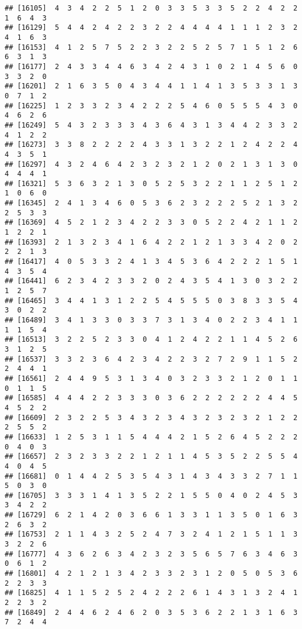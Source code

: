 \documentclass[
]{article}
\begin{document}
\begin{verbatim}
## [16105]  4  3  4  2  2  5  1  2  0  3  3  5  3  3  5  2  2  4  2  2  1  6  4  3
## [16129]  5  4  4  2  4  2  2  3  2  2  4  4  4  4  1  1  1  2  3  2  4  1  6  3
## [16153]  4  1  2  5  7  5  2  2  3  2  2  5  2  5  7  1  5  1  2  6  6  3  1  3
## [16177]  2  4  3  3  4  4  6  3  4  2  4  3  1  0  2  1  4  5  6  0  3  3  2  0
## [16201]  2  1  6  3  5  0  4  3  4  4  1  1  4  1  3  5  3  3  1  3  0  7  1  2
## [16225]  1  2  3  3  2  3  4  2  2  2  5  4  6  0  5  5  5  4  3  0  4  6  2  6
## [16249]  5  4  3  2  3  3  3  4  3  6  4  3  1  3  4  4  2  3  3  2  4  1  2  2
## [16273]  3  3  8  2  2  2  2  4  3  3  1  3  2  2  1  2  4  2  2  4  4  3  5  1
## [16297]  4  3  2  4  6  4  2  3  2  3  2  1  2  0  2  1  3  1  3  0  4  4  4  1
## [16321]  5  3  6  3  2  1  3  0  5  2  5  3  2  2  1  1  2  5  1  2  1  0  6  0
## [16345]  2  4  1  3  4  6  0  5  3  6  2  3  2  2  2  5  2  1  3  2  2  5  3  3
## [16369]  4  5  2  1  2  3  4  2  2  3  3  0  5  2  2  4  2  1  1  2  1  2  2  1
## [16393]  2  1  3  2  3  4  1  6  4  2  2  1  2  1  3  3  4  2  0  2  2  2  1  3
## [16417]  4  0  5  3  3  2  4  1  3  4  5  3  6  4  2  2  2  1  5  1  4  3  5  4
## [16441]  6  2  3  4  2  3  3  2  0  2  4  3  5  4  1  3  0  3  2  2  1  2  5  7
## [16465]  3  4  4  1  3  1  2  2  5  4  5  5  5  0  3  8  3  3  5  4  3  0  2  2
## [16489]  3  4  1  3  3  0  3  3  7  3  1  3  4  0  2  2  3  4  1  1  1  1  5  4
## [16513]  3  2  2  5  2  3  3  0  4  1  2  4  2  2  1  1  4  5  2  6  3  1  2  5
## [16537]  3  3  2  3  6  4  2  3  4  2  2  3  2  7  2  9  1  1  5  2  2  4  4  1
## [16561]  2  4  4  9  5  3  1  3  4  0  3  2  3  3  2  1  2  0  1  1  0  1  1  5
## [16585]  4  4  4  2  2  3  3  3  0  3  6  2  2  2  2  2  2  4  4  5  4  5  2  2
## [16609]  2  3  2  2  5  3  4  3  2  3  4  3  2  3  2  3  2  1  2  2  2  5  5  2
## [16633]  1  2  5  3  1  1  5  4  4  4  2  1  5  2  6  4  5  2  2  2  0  4  0  3
## [16657]  2  3  2  3  3  2  2  1  2  1  1  4  5  3  5  2  2  5  5  4  4  0  4  5
## [16681]  0  1  4  4  2  5  3  5  4  3  1  4  3  4  3  3  2  7  1  1  5  0  3  0
## [16705]  3  3  3  1  4  1  3  5  2  2  1  5  5  0  4  0  2  4  5  3  3  4  2  2
## [16729]  6  2  1  4  2  0  3  6  6  1  3  3  1  1  3  5  0  1  6  3  2  6  3  2
## [16753]  2  1  1  4  3  2  5  2  4  7  3  2  4  1  2  1  5  1  1  3  3  2  2  6
## [16777]  4  3  6  2  6  3  4  2  3  2  3  5  6  5  7  6  3  4  6  3  0  6  1  2
## [16801]  4  2  1  2  1  3  4  2  3  3  2  3  1  2  0  5  0  5  3  6  2  2  3  3
## [16825]  4  1  1  5  2  5  2  4  2  2  2  6  1  4  3  1  3  2  4  1  2  2  3  2
## [16849]  2  4  4  6  2  4  6  2  0  3  5  3  6  2  2  1  3  1  6  3  7  2  4  4

\end{verbatim}
\end{document}
